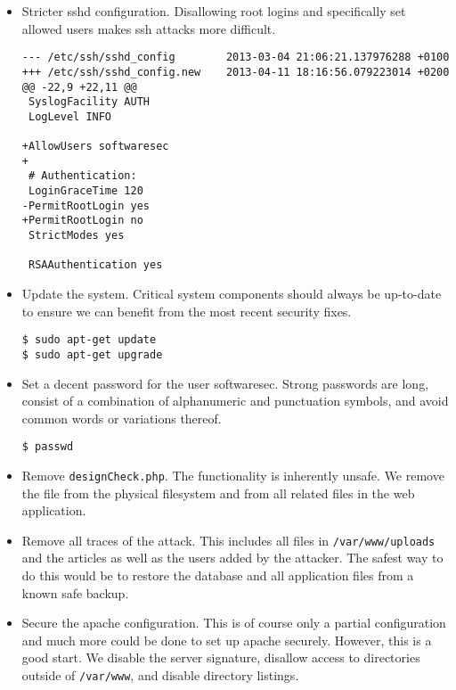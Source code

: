 \documentclass[a4paper,10pt]{article}
\begin{document}
\begin{itemize}
\item Stricter sshd configuration. Disallowing root logins and specifically
      set allowed users makes ssh attacks more difficult.

\begin{verbatim}
--- /etc/ssh/sshd_config        2013-03-04 21:06:21.137976288 +0100
+++ /etc/ssh/sshd_config.new    2013-04-11 18:16:56.079223014 +0200
@@ -22,9 +22,11 @@
 SyslogFacility AUTH
 LogLevel INFO
 
+AllowUsers softwaresec
+
 # Authentication:
 LoginGraceTime 120
-PermitRootLogin yes
+PermitRootLogin no
 StrictModes yes
 
 RSAAuthentication yes
\end{verbatim}

\item Update the system. Critical system components should always be up-to-date
      to ensure we can benefit from the most recent security fixes.

\begin{verbatim}
$ sudo apt-get update
$ sudo apt-get upgrade
\end{verbatim}

\item Set a decent password for the user softwaresec. Strong passwords are long,
      consist of a combination of alphanumeric and punctuation symbols, and avoid
      common words or variations thereof.

\begin{verbatim}
$ passwd
\end{verbatim}

\item Remove \verb|designCheck.php|. The functionality is inherently unsafe. We
      remove the file from the physical filesystem and from all related files
      in the web application.
      
\item Remove all traces of the attack. This includes all files in \verb|/var/www/uploads|
      and the articles as well as the users added by the attacker. The safest way
      to do this would be to restore the database and all application files from 
      a known safe backup.
      
\item Secure the apache configuration. This is of course only a partial
      configuration and much more could be done to set up apache securely. However,
      this is a good start. We disable the server signature, disallow access to directories
      outside of \verb|/var/www|, and disable directory listings.


\end{itemize}
\end{document}
